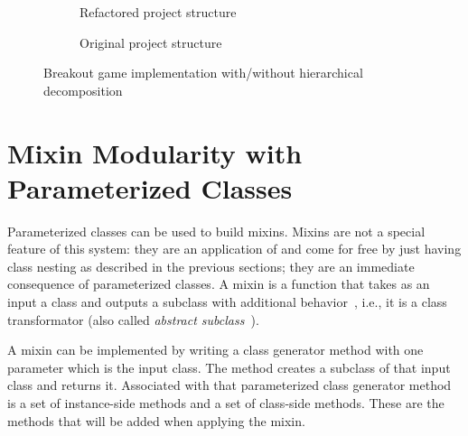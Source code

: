 \begin{figure}[!htp]
\begin{subfigure}[b]{0.45\textwidth}
\caption{Refactored project structure}
\end{subfigure}
\qquad
\begin{subfigure}[b]{0.45\textwidth}
\caption{Original project structure}
\end{subfigure}
\caption{Breakout game implementation with/without hierarchical decomposition}
\label{fig:usecase_breakout_game}
\end{figure}


\section{Mixin Modularity with Parameterized Classes}
Parameterized classes can be used to build mixins. Mixins are not a special feature of this system: they are an application of \msname and come for free by just having class nesting as described in the previous sections; they are an immediate consequence of parameterized classes. A mixin is a function that takes as an input a class and outputs a subclass with additional behavior~\cite{bracha1992programming, Bettini:2004:CCH:967900.968200, nestedinterfaces}, i.e., it is a class transformator (also called \emph{abstract subclass}~\cite{Bracha:1990:MI:97945.97982}). 

A mixin can be implemented by writing a class generator method with one parameter which is the input class. The method creates a subclass of that input class and returns it. Associated with that parameterized class generator method is a set of instance-side methods and a set of class-side methods. These are the methods that will be added when applying the mixin.

